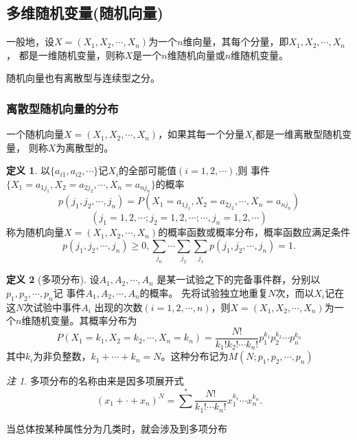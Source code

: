 \documentclass[a4paper,11pt]{article}%
\theoremstyle{remark}
\newtheorem*{remark}{注}
\theoremstyle{remark}
\theoremstyle{definition}
\theoremstyle{definition}
\newtheorem*{definition}{定义}
\theoremstyle{plain}
\begin{document}
\subsection{多维随机变量(随机向量)}
一般地，设$X=(X_1,X_2,\cdots,X_n)$为一个$n$维向量，其每个分量，即$X_1,X_2,\cdots,X_n$，
都是一维随机变量，则称$X$是一个$n$维随机向量或$n$维随机变量。

随机向量也有离散型与连续型之分。
\subsubsection{离散型随机向量的分布}
一个随机向量$X=(X_1,X_2,\cdots,X_n)$，如果其每一个分量$X_i$都是一维离散型随机变量，
则称$X$为离散型的。
\begin{definition}
    以$\{a_{i1},a_{i2},\cdots\}$记$X_i$的全部可能值$(i=1,2,\cdots)$,则
    事件$\{X_1=a_{1j_1},X_2=a_{2j_2},\cdots,X_n=a_{nj_n}\}$的概率 
    \[p(j_1,j_2,\cdots,j_n)=P(X_1=a_{1j_1},X_2=a_{2j_2},\cdots,X_n=a_{nj_n})\]
    \[(j_1=1,2,\cdots;j_2=1,2,\cdots;\cdots,j_n=1,2,\cdots)\]
    称为随机向量$X=(X_1,X_2,\cdots,X_n)$的概率函数或概率分布，概率函数应满足条件
    \[p(j_1,j_2,\cdots,j_n)\geq 0,\sum_{j_n}\cdots\sum_{j_2}\sum_{j_1}p(j_1,j_2,\cdots,j_n)=1.\]

\end{definition}
\begin{definition}[多项分布]
   设$A_1,A_2,\cdots,A_n$ 是某一试验之下的完备事件群，分别以$p_1,p_2,\cdots,p_n$记
   事件$A_1,A_2,\cdots,A_n$的概率。 先将试验独立地重复$N$次，而以$X_i$记在这$N$次试验中事件$A_i$
   出现的次数$(i=1,2,\cdots,n)$，则$X=(X_1,X_2,\cdots,X_n)$为一个$n$维随机变量。其概率分布为
   \[P(X_1=k_{1},X_2=k_{2},\cdots,X_n=k_{n})=\frac{N!}{k_1!k_2!\cdots k_n!}p_1^{k_1}p_2^{k_2}\cdots p_n^{k_n}\]
   其中$k_i$为非负整数，$k_1+\cdots+k_n=N$。这种分布记为$M(N;p_1,p_2,\cdots,p_n)$
\end{definition}
\begin{remark}
    多项分布的名称由来是因多项展开式
    \[(x_1+\cdot+x_n)^N=\sum^*\frac{N!}{k_1!\cdots k_n!}x_1^{k_1}\cdots x_n^{k_n}.\]
\end{remark}
当总体按某种属性分为几类时，就会涉及到多项分布
\end{document}
